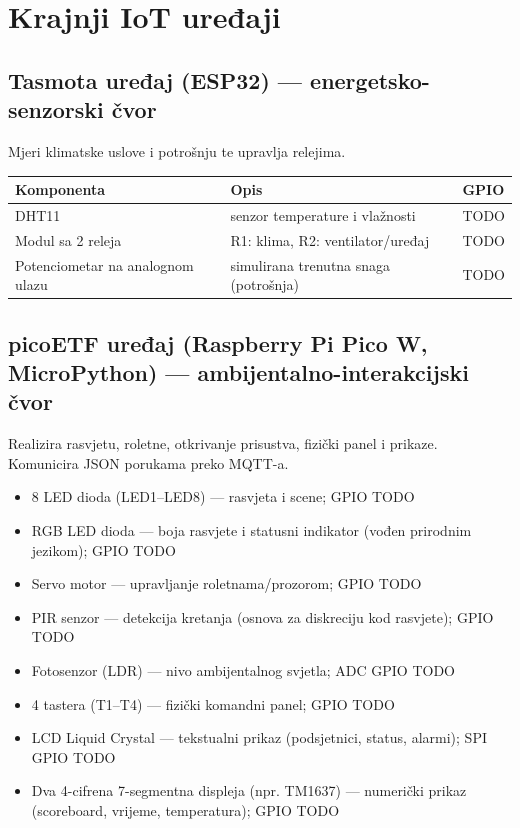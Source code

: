 \documentclass[11pt,a4paper]{article}
\begin{document}

\section{Krajnji IoT uređaji}

\subsection{Tasmota uređaj (ESP32) --- energetsko-senzorski čvor}
Mjeri klimatske uslove i potrošnju te upravlja relejima.
\begin{table}[ht]
      \centering
      \begin{tabular}{@{}lll@{}}
            \toprule
            \textbf{Komponenta}              & \textbf{Opis}                         & \textbf{GPIO} \\
            \midrule
            DHT11                            & senzor temperature i vlažnosti        & TODO          \\
            Modul sa 2 releja                & R1: klima, R2: ventilator/uređaj      & TODO          \\
            Potenciometar na analognom ulazu & simulirana trenutna snaga (potrošnja) & TODO          \\
            \bottomrule
      \end{tabular}
\end{table}

\subsection{picoETF uređaj (Raspberry Pi Pico W, MicroPython) --- ambijentalno-interakcijski čvor}
Realizira rasvjetu, roletne, otkrivanje prisustva, fizički panel i prikaze. Komunicira
JSON porukama preko MQTT-a.
\begin{itemize}[nosep]
      \item 8 LED dioda (LED1--LED8) --- rasvjeta i scene; GPIO TODO
      \item RGB LED dioda --- boja rasvjete i statusni indikator (vođen prirodnim jezikom); GPIO TODO
      \item Servo motor --- upravljanje roletnama/prozorom; GPIO TODO
      \item PIR senzor --- detekcija kretanja (osnova za diskreciju kod rasvjete); GPIO TODO
      \item Fotosenzor (LDR) --- nivo ambijentalnog svjetla; ADC GPIO TODO
      \item 4 tastera (T1--T4) --- fizički komandni panel; GPIO TODO
      \item LCD Liquid Crystal --- tekstualni prikaz (podsjetnici, status, alarmi); SPI GPIO TODO
      \item Dva 4-cifrena 7-segmentna displeja (npr. TM1637) --- numerički prikaz (scoreboard,
            vrijeme, temperatura); GPIO TODO
\end{itemize}
\end{document}
